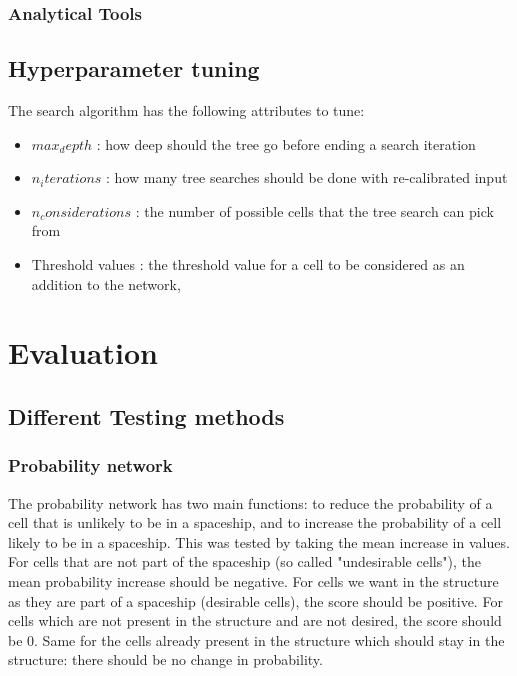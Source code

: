 \documentclass{l4proj}
\begin{document}
\subsection{Analytical Tools}


\section{Hyperparameter tuning}

The search algorithm has the following attributes to tune:

\begin{itemize}
    \item $max_depth$ : how deep should the tree go before ending a search iteration
    \item $n_iterations$ : how many tree searches should be done with re-calibrated input
    \item $n_considerations$ : the number of possible cells that the tree search can pick from
    \item Threshold values : the threshold value for a cell to be considered as an addition to the network, %
\end{itemize}



\chapter{Evaluation} 

\section{Different Testing methods}

\subsection{Probability network}

The probability network has two main functions: to reduce the probability of a cell that is unlikely to be in a spaceship, and to increase the probability of a cell likely to be in a spaceship. This was tested by taking the mean increase in values. For cells that are not part of the spaceship (so called "undesirable cells"), the mean probability increase should be negative. For cells we want in the structure as they are part of a spaceship (desirable cells), the score should be positive. For cells which are not present in the structure and are not desired, the score should be 0. Same for the cells already present in the structure which should stay in the structure: there should be no change in probability. 
\end{document}
